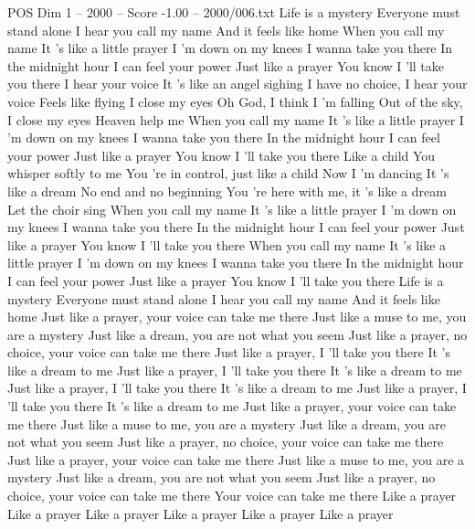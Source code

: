 \begin{textsample}{POS Dim 1 – 2000 – Score -1.00 – 2000/006.txt}  \label{ex:f1_pos_035}
Life is a mystery Everyone must stand alone I hear you call my name And it feels like home When you call my name It 's like a little prayer I 'm down on my knees I wanna take you there In the midnight hour I can feel your power Just like a prayer You know I 'll take you there I hear your voice It 's like an angel sighing I have no choice, I hear your voice Feels like flying I close my eyes Oh God, I think I 'm falling Out of the sky, I close my eyes Heaven help me When you call my name It 's like a little prayer I 'm down on my knees I wanna take you there In the midnight hour I can feel your power Just like a prayer You know I 'll take you there Like a child You whisper softly to me You 're in control, just like a child Now I 'm dancing It 's like a dream No end and no beginning You 're here with me, it 's like a dream Let the choir sing When you call my name It 's like a little prayer I 'm down on my knees I wanna take you there In the midnight hour I can feel your power Just like a prayer You know I 'll take you there When you call my name It 's like a little prayer I 'm down on my knees I wanna take you there In the midnight hour I can feel your power Just like a prayer You know I 'll take you there Life is a mystery Everyone must stand alone I hear you call my name And it feels like home Just like a prayer, your voice can take me there Just like a muse to me, you are a mystery Just like a dream, you are not what you seem Just like a prayer, no choice, your voice can take me there Just like a prayer, I 'll take you there It 's like a dream to me Just like a prayer, I 'll take you there It 's like a dream to me Just like a prayer, I 'll take you there It 's like a dream to me Just like a prayer, I 'll take you there It 's like a dream to me Just like a prayer, your voice can take me there Just like a muse to me, you are a mystery Just like a dream, you are not what you seem Just like a prayer, no choice, your voice can take me there Just like a prayer, your voice can take me there Just like a muse to me, you are a mystery Just like a dream, you are not what you seem Just like a prayer, no choice, your voice can take me there Your voice can take me there Like a prayer Like a prayer Like a prayer Like a prayer Like a prayer Like a prayer

\end{textsample}
